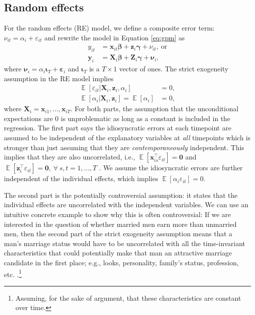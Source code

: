 \documentclass[]{interact}
\theoremstyle{plain}%
\theoremstyle{definition}
\theoremstyle{remark}
\begin{document}
\hypertarget{re}{%
\subsection{Random effects}\label{re}}

For the random effects (RE) model, we define a composite error term:
\(\nu_{it} = \alpha_{i} + \varepsilon_{it}\) and rewrite the model in
Equation \eqref{eq:gpm} as \begin{align}
y_{it} & = \bm{x}_{it}\bm{\beta} + \bm{z}_{i}\bm{\gamma} + \nu_{it}, \ \text{or} \\
\bm{y}_{i} & = \bm{X}_{i}\bm{\beta} + \bm{Z}_{i}\bm{\gamma} + \bm{\nu}_{i},
\end{align} where
\(\bm{\nu}_{i} = \alpha_{i} \bm{\iota}_{T} + \bm{\varepsilon}_{i}\) and
\(\bm{\iota}_{T}\) is a \(T \times 1\) vector of ones. The strict
exogeneity assumption in the RE model implies \begin{align}
\mathop{\mathrm{\mathbb{E}}}[\varepsilon_{it} | \bm{X}_{i}, \bm{z}_{i}, \alpha_{i}] & = 0, \\
\mathop{\mathrm{\mathbb{E}}}[\alpha_{i} |\bm{X}_{i}, \bm{z}_{i}] = \mathop{\mathrm{\mathbb{E}}}[\alpha_{i}] & = 0,
\end{align} where \(\bm{X}_{i} = \bm{x}_{i1}, ..., \bm{x}_{iT}\). For
both parts, the assumption that the unconditional expectations are 0 is
unproblematic as long as a constant is included in the regression. The
first part says the idiosyncratic errors at each timepoint are assumed
to be independent of the explanatory variables at \textit{all}
timepoints which is stronger than just assuming that they are
\textit{contemporaneously} independent. This implies that they are also
uncorrelated, i.e.,
\(\mathop{\mathrm{\mathbb{E}}}[\bm{x}_{is}^{\intercal}\varepsilon_{it}] = \bm{0}\)
and
\(\mathop{\mathrm{\mathbb{E}}}[\bm{z}_{i}^{\intercal}\varepsilon_{it}] = \bm{0}, \ \forall \ s, t = 1, ..., T\)
\citep{Wooldridge2002, Bruederl2015}. We assume the idiosyncratic errors
are further independent of the individual effects, which implies
\(\mathop{\mathrm{\mathbb{E}}}[\alpha_{i}\varepsilon_{it}] = 0\).

The second part is the potentially controversial assumption: it states
that the individual effects are uncorrelated with the independent
variables. We can use an intuitive concrete example to show why this is
often controversial: If we are interested in the question of whether
married men earn more than unmarried men, then the second part of the
strict exogeneity assumption means that a man's marriage status would
have to be uncorrelated with all the time-invariant characteristics that
could potentially make that man an attractive marriage candidate in the
first place; e.g., looks, personality, family's status, profession, etc.
\citep{Bruederl2015}.\footnote{Assuming, for the sake of argument, that
  these characteristics are constant over time.}
\end{document}
